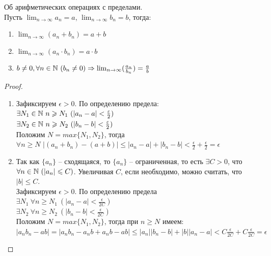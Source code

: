     \begin{theorem}{Об арифметических операциях с пределами.}
        \\
        Пусть $\lim_{n \to \infty} a_{n} = a$, $\lim_{n \to \infty} b_{n} = b$, тогда:
        \begin{enumerate}
            \item $\lim_{n \to \infty}(a_{n} + b_{n}) = a+b$
            \item $\lim_{n \to \infty}(a_{n} \cdot b_{n}) = a \cdot b$
            \item $b \neq 0, \forall n \in \mathbb{N} \ (b_{n} \neq 0) \Rightarrow \lim_{n \to \infty}(\frac{a_{n}}{b_{n}}) = \frac{a}{b}$
        \end{enumerate}
    \end{theorem}

    \begin{proof} \
        \begin{enumerate}
        \item Зафиксируем $\epsilon > 0$. По определению предела:\\
            $\exists N_1 \in \mathbb{N} \ n \geqslant N_1 \ (|a_{n}-a| < \frac{\varepsilon}{2})$\\
            $\exists N_2 \in \mathbb{N} \ n \geqslant N_2 \ (|b_{n}-b| < \frac{\varepsilon}{2})$\\
            Положим $N = max\{N_1, N_2\}$, тогда\\
            $\forall n \geq N$ $|(a_{n} + b_{n}) - (a + b)| \leq |a_{n} - a| + |b_{n} - b| < \frac{\epsilon}{2} + \frac{\epsilon}{2} = \epsilon$
        
        \item Так как $\{a_{n}\}$ -- сходящаяся, то $\{a_{n}\}$ -- ограниченная, то есть $\exists C > 0$, что $\forall n \in \mathbb{N} \ (|a_{n}| \leqslant C)$. Увеличивая $C$, если необходимо, можно считать, что $|b| \leq C$.\\
            Зафиксируем $\epsilon > 0$. По определению предела\\
            $\exists N_1 \ \forall n \geq N_1 \ (|a_{n} - a| < \frac{\epsilon}{2C})$\\
            $\exists N_2 \ \forall n \geq N_2 \ (|b_{n} - b| < \frac{\epsilon}{2C})$\\
            Положим $N = max\{N_1, N_2\}$, тогда при $n \geq N$ имеем:\\
            $|a_{n}b_{n} - ab| = |a_{n}b_{n} - a_{n}b + a_{n}b - ab| \leq |a_{n}||b_{n} - b| + |b||a_{n} - a| < C\frac{\epsilon}{2C} + C\frac{\epsilon}{2C} = \epsilon$
   

\end{enumerate}
\end{proof}
